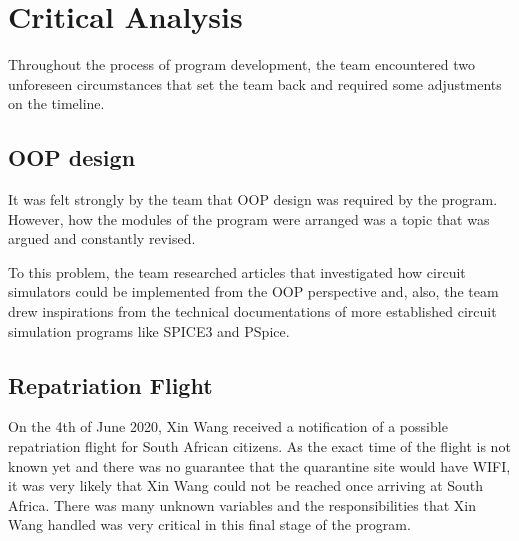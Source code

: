 \documentclass[12pt,a4paper]{article}
\begin{document}
\section{Critical Analysis}
Throughout the process of program development, the team encountered two unforeseen circumstances that set the team back 
and required some adjustments on the timeline.
\subsection{OOP design}
It was felt strongly by the team that OOP design was required by the program. However, how the modules of the program were 
arranged was a topic that was argued and constantly revised. \par 
To this problem, the team researched articles that investigated how circuit simulators could be implemented from the 
OOP perspective and, also, the team drew inspirations from the technical documentations of more established circuit 
simulation programs like SPICE3 and PSpice.
\subsection{Repatriation Flight}
On the 4th of June 2020, Xin Wang received a notification of a possible repatriation flight for South African citizens.
As the exact time of the flight is not known yet and there was no guarantee that the quarantine site would have WIFI, it
was very likely that Xin Wang could not be reached once arriving at South Africa. There was many unknown variables and the 
responsibilities that Xin Wang handled was very critical in this final stage of the program. \par 
\end{document}
